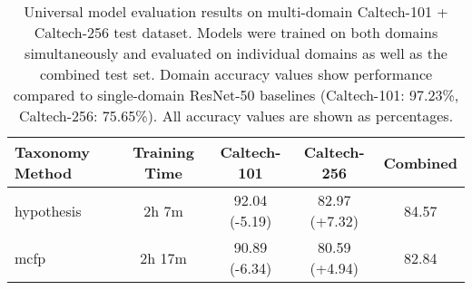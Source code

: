 \begin{table}[ht]
\centering
\caption{Universal model evaluation results on multi-domain Caltech-101 + Caltech-256 test dataset. Models were trained on both domains simultaneously and evaluated on individual domains as well as the combined test set. Domain accuracy values show performance compared to single-domain ResNet-50 baselines (Caltech-101: 97.23\%, Caltech-256: 75.65\%). All accuracy values are shown as percentages.}
\label{tab:universal_model_results}
\begin{tabular}{lcccc}
\toprule
Taxonomy Method & Training Time & Caltech-101 & Caltech-256 & Combined \\
\midrule
hypothesis & 2h 7m & 92.04 (-5.19) & 82.97 (+7.32) & 84.57 \\
mcfp & 2h 17m & 90.89 (-6.34) & 80.59 (+4.94) & 82.84 \\
\bottomrule
\end{tabular}
\end{table}
